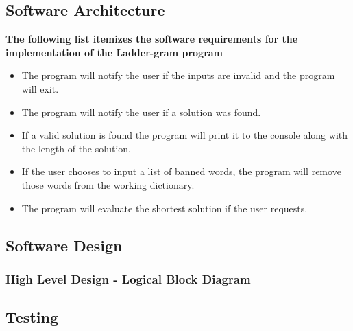 \documentclass[12pt, a4]{report}
\begin{document}
	\subsection{Software Architecture}
	\textbf{The following list itemizes the software requirements for the implementation of the Ladder-gram program}
	\begin{itemize}
		\item The program will notify the user if the inputs are invalid and the program will exit.
		\item The program will notify the user if a solution was found.
		\item If a valid solution is found the program will print it to the console along with the length of the solution.
		\item If the user chooses to input a list of banned words, the program will remove those words from the working dictionary. 
		\item The program will evaluate the shortest solution if the user requests.
	\end{itemize}
	\pagebreak
	
	\subsection{Software Design}
	\subsubsection{High Level Design - Logical Block Diagram}
	
	
	\pagebreak
	
	
	\subsection{Testing}
	
\end{document}
